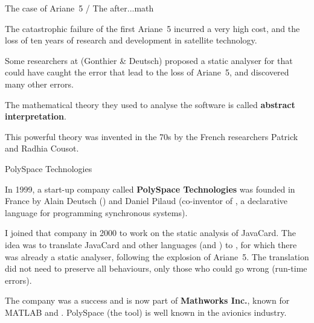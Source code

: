 \documentclass[compress,dvipdfmx]{beamer}
\begin{document}
\begin{frame}{The case of Ariane~5 / The after...math}

  The catastrophic failure of the first Ariane~5 incurred a very high
  cost, and the loss of ten years of research and development in
  satellite technology.

  \bigskip

  Some researchers at \Inria (Gonthier \& Deutsch) proposed a static
  analyser for \Ada that could have caught the error that lead to the
  loss of Ariane~5, and discovered many other errors.

  \bigskip

  The mathematical theory they used to analyse the software is called
  \textbf{abstract interpretation}.

  \bigskip

  This powerful theory was invented in the 70s by the French
  researchers Patrick and Radhia Cousot.

\end{frame}


\begin{frame}{PolySpace Technologies}

  In 1999, a start-up company called \textbf{PolySpace Technologies}
  was founded in France by Alain Deutsch (\Inria) and Daniel Pilaud
  (co\hyp{}inventor of \Lustre, a declarative language for programming
  synchronous systems).

  \bigskip

  I joined that company in 2000 to work on the static analysis of
  JavaCard. The idea was to translate JavaCard and other languages
  (\Clang and \Cpp) to \Ada, for which there was already a static
  analyser, following the explosion of Ariane~5. The translation did
  not need to preserve all behaviours, only those who could go wrong
  (run\hyp{}time errors).

  \bigskip

  The company was a success and is now part of \textbf{Mathworks
    Inc.}, known for MATLAB and \Simulink. PolySpace (the tool) is
  well known in the avionics industry.

\end{frame}
\end{document}
